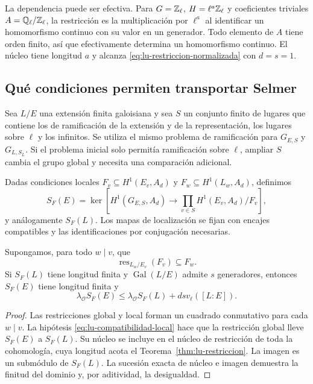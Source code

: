 La dependencia puede ser efectiva. Para $G=\mathbb{Z}_\ell$,
$H=\ell^a\mathbb{Z}_\ell$ y coeficientes triviales
$A=\mathbb{Q}_\ell/\mathbb{Z}_\ell$, la restricción es la multiplicación por
$\ell^a$ al identificar un homomorfismo continuo con su valor
en un generador. Todo elemento de $A$ tiene orden finito, así
que efectivamente determina un homomorfismo continuo. El núcleo
tiene longitud $a$ y alcanza \eqref{eq:lu-restriccion-normalizada}
con $d=s=1$.

\subsection{Qué condiciones permiten transportar Selmer}
\label{subsec:lu-selmer}

Sea $L/E$ una extensión finita galoisiana y sea $S$ un conjunto
finito de lugares que contiene los de ramificación de la
extensión y de la representación, los lugares sobre $\ell$ y
los infinitos. Se utiliza el mismo problema de ramificación
para $G_{E,S}$ y $G_{L,S_L}$. Si el problema inicial solo permitía
ramificación sobre $\ell$, ampliar $S$ cambia el grupo global
y necesita una comparación adicional.

Dadas condiciones locales $F_v\subseteq H^1(E_v,A_d)$ y
$F_w\subseteq H^1(L_w,A_d)$, definimos
\[
 S_F(E)=\ker\!\left[H^1(G_{E,S},A_d)\to
             \prod_{v\in S}H^1(E_v,A_d)/F_v\right],
\]
y análogamente $S_F(L)$. Los mapas de localización se fijan con
encajes compatibles y las identificaciones por conjugación
necesarias.

\begin{proposicion}
\label{prop:lu-selmer}
Supongamos, para todo $w\mid v$, que
\begin{equation}
 \operatorname{res}_{L_w/E_v}(F_v)\subseteq F_w.
 \label{eq:lu-compatibilidad-local}
\end{equation}
Si $S_F(L)$ tiene longitud finita y $\operatorname{Gal}(L/E)$
admite $s$ generadores, entonces $S_F(E)$ tiene longitud finita y
\begin{equation}
 \lambda_{\mathcal O}S_F(E)
 \le\lambda_{\mathcal O}S_F(L)+d s v_\ell([L:E]).
 \label{eq:lu-selmer}
\end{equation}
\end{proposicion}
\begin{proof}
Las restricciones global y local forman un cuadrado conmutativo
para cada $w\mid v$. La hipótesis
\eqref{eq:lu-compatibilidad-local} hace que la restricción global
lleve $S_F(E)$ a $S_F(L)$. Su núcleo se incluye en el núcleo de
restricción de toda la cohomología, cuya longitud acota el
Teorema~\ref{thm:lu-restriccion}. La imagen es un submódulo de
$S_F(L)$. La sucesión exacta de núcleo e imagen demuestra la
finitud del dominio y, por aditividad, la desigualdad.
\end{proof}

